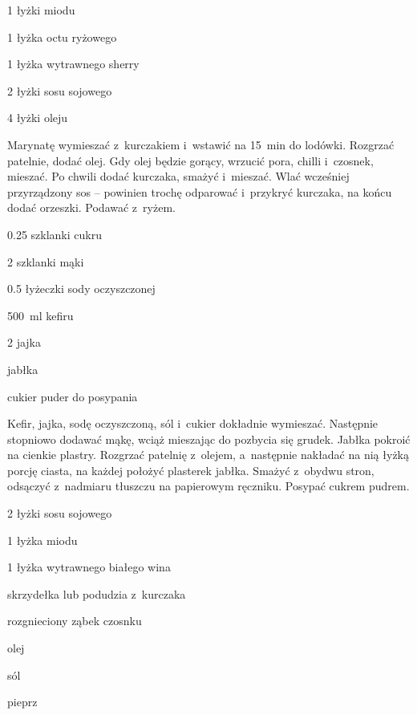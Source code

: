 \documentclass[../main.tex]{subfiles}
\begin{document}
\begin{Ingred}[sos]
    \item \num{1} łyżki miodu
    \item \num{1} łyżka octu ryżowego
    \item \num{1} łyżka wytrawnego sherry
    \item \num{2} łyżki sosu sojowego
    \item \num{4} łyżki oleju
\end{Ingred}

Marynatę wymieszać z~kurczakiem i~wstawić na \qty{15}{\minute} do lodówki.
Rozgrzać patelnie, dodać olej. Gdy olej będzie gorący, wrzucić pora, chilli
i~czosnek, mieszać. Po chwili dodać kurczaka, smażyć i~mieszać. Wlać wcześniej
przyrządzony sos – powinien trochę odparować i~przykryć kurczaka, na końcu
dodać orzeszki. Podawać z~ryżem.


\begin{Ingred}
    \item \num{.25} szklanki cukru
    \item \num{2} szklanki mąki
    \item \num{0.5} łyżeczki sody oczyszczonej
    \item \qty{500}{\milli\litre} kefiru
    \item \num{2} jajka
    \item jabłka
    \item cukier puder do posypania
\end{Ingred}

Kefir, jajka, sodę oczyszczoną, sól i~cukier dokładnie wymieszać. Następnie
stopniowo dodawać mąkę, wciąż mieszając do pozbycia się grudek. Jabłka pokroić
na cienkie plastry. Rozgrzać patelnię z~olejem, a~następnie nakładać na nią
łyżką porcję ciasta, na każdej położyć plasterek jabłka. Smażyć z~obydwu stron,
odsączyć z~nadmiaru tłuszczu na papierowym ręczniku. Posypać cukrem pudrem.


\begin{Ingred}
    \item \num{2} łyżki sosu sojowego
    \item \num{1} łyżka miodu
    \item \num{1} łyżka wytrawnego białego wina
    \item skrzydełka lub podudzia z~kurczaka
    \item rozgnieciony ząbek czosnku
    \item olej
    \item sól
    \item pieprz
\end{Ingred}
\end{document}
